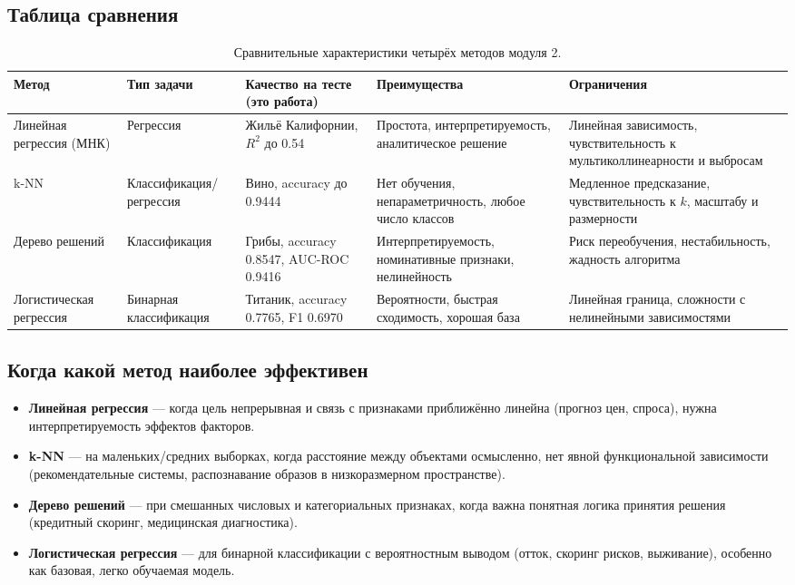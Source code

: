 \documentclass[12pt,a4paper]{article}
\begin{document}
\subsection{Таблица сравнения}
\begin{table}[H]
\centering
\caption{Сравнительные характеристики четырёх методов модуля 2.}
\label{tab:summary}
\small
\begin{tabular}{p{2.4cm}p{2.1cm}p{2.6cm}p{3.4cm}p{3.2cm}}
\toprule
Метод & Тип задачи & Качество на тесте (это работа) & Преимущества & Ограничения \\
\midrule
Линейная регрессия (МНК) & Регрессия & Жильё Калифорнии, $R^2$ до 0.54 & Простота, интерпретируемость, аналитическое решение & Линейная зависимость, чувствительность к мультиколлинеарности и выбросам \\
k-NN & Классификация/регрессия & Вино, accuracy до 0.9444 & Нет обучения, непараметричность, любое число классов & Медленное предсказание, чувствительность к $k$, масштабу и размерности \\
Дерево решений & Классификация & Грибы, accuracy 0.8547, AUC-ROC 0.9416 & Интерпретируемость, номинативные признаки, нелинейность & Риск переобучения, нестабильность, жадность алгоритма \\
Логистическая регрессия & Бинарная классификация & Титаник, accuracy 0.7765, F1 0.6970 & Вероятности, быстрая сходимость, хорошая база & Линейная граница, сложности с нелинейными зависимостями \\
\bottomrule
\end{tabular}
\end{table}

\subsection{Когда какой метод наиболее эффективен}
\begin{itemize}
\item \textbf{Линейная регрессия} --- когда цель непрерывная и связь с признаками приближённо линейна (прогноз цен, спроса), нужна интерпретируемость эффектов факторов.
\item \textbf{k-NN} --- на маленьких/средних выборках, когда расстояние между объектами осмысленно, нет явной функциональной зависимости (рекомендательные системы, распознавание образов в низкоразмерном пространстве).
\item \textbf{Дерево решений} --- при смешанных числовых и категориальных признаках, когда важна понятная логика принятия решения (кредитный скоринг, медицинская диагностика).
\item \textbf{Логистическая регрессия} --- для бинарной классификации с вероятностным выводом (отток, скоринг рисков, выживание), особенно как базовая, легко обучаемая модель.
\end{itemize}
\end{document}
